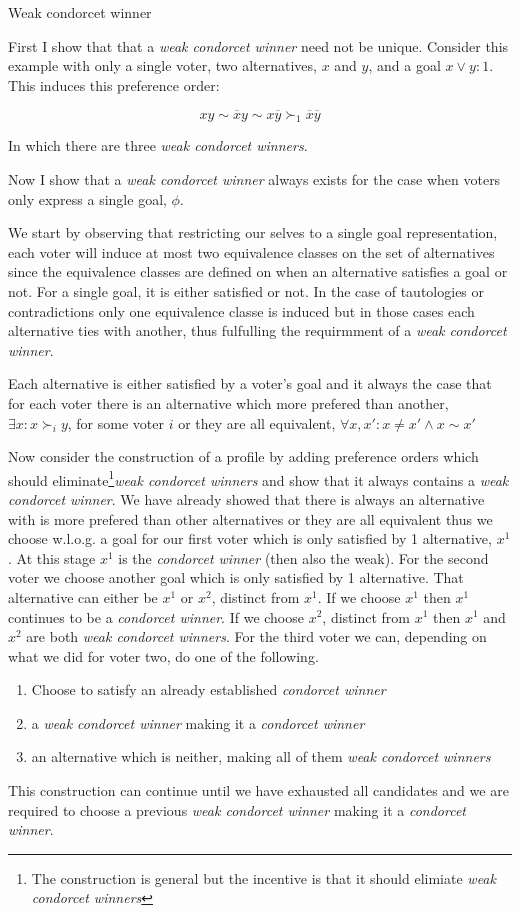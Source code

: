\documentclass[12pt]{article}
\newenvironment{answer}[2][Answer]{\begin{trivlist}
\item[\hskip \labelsep {\bfseries #1}\hskip \labelsep {\bfseries #2:}]}{\end{trivlist}}
\begin{document}
\begin{answer}{a)}{Weak condorcet winner}

First I show that that a \textit{weak condorcet winner} need not be unique. Consider this example with only a single voter, two alternatives, $x$ and $y$, and a goal $x \lor y:1$. This induces this preference order:

$$xy \sim \overline{x}y  \sim x\overline{y} \succ_1 \overline{x}\overline{y}$$

In which there are three \textit{weak condorcet winners}.

Now I show that a \textit{weak condorcet winner} always exists for the case when voters only express a single goal, $\phi$.

We start by observing that restricting our selves to a single goal representation, each voter will induce at most two equivalence classes on the set of alternatives since the equivalence classes are defined on when an alternative satisfies a goal or not. For a single goal, it is either satisfied or not. In the case of tautologies or contradictions only one equivalence classe is induced but in those cases each alternative ties with another, thus fulfulling the requirmment of a \textit{weak condorcet winner}.

Each alternative is either satisfied by a voter's goal and it always the case that for each voter there is an alternative which more prefered than another, $\exists x:x \succ_i y$, for some voter $i$ or they are all equivalent, $\forall x,x':x \neq x' \land x \sim x'$

Now consider the construction of a profile by adding preference orders which should eliminate\footnote{The construction is general but the incentive is that it should elimiate \textit{weak condorcet winners}}\textit{weak condorcet winners} and show that it always contains a \textit{weak condorcet winner}. We have already showed that there is always an alternative with is more prefered than other alternatives or they are all equivalent thus we choose w.l.o.g. a goal for our first voter which is only satisfied by 1 alternative, $x^1$. At this stage $x^1$ is the \textit{condorcet winner} (then also the weak). For the second voter we choose another goal which is only satisfied by 1 alternative. That alternative can either be $x^1$ or $x^2$, distinct from $x^1$. If we choose $x^1$ then $x^1$ continues to be a \textit{condorcet winner}. If we choose $x^2$, distinct from $x^1$ then $x^1$ and $x^2$ are both \textit{weak condorcet winners}. For the third voter we can, depending on what we did for voter two, do one of the following.
\begin{enumerate}
\item Choose to satisfy an already established \textit{condorcet winner}
\item a \textit{weak condorcet winner} making it a \textit{condorcet winner}
\item an alternative which is neither, making all of them \textit{weak condorcet winners}
\end{enumerate}
This construction can continue until we have exhausted all candidates and we are required to choose a previous \textit{weak condorcet winner} making it a \textit{condorcet winner}.


\end{answer}
\end{document}
